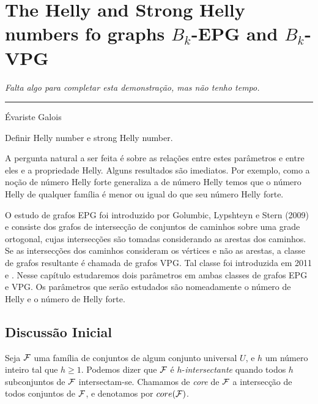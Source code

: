 \chapter{The Helly and Strong Helly numbers fo graphs $B_k$-EPG and $B_k$-VPG}
\label{cap:iv}

\begin{flushright}
\begin{minipage}[t][0cm][b]{0.47\textwidth}
\emph{
Falta algo para completar esta demonstração, mas não tenho tempo.}
\end{minipage}

\rule[0cm]{7cm}{0.03cm}%

Évariste Galois
\end{flushright}

Definir Helly number e strong Helly number.

A pergunta natural a ser feita é sobre as relações entre estes parâmetros e entre
eles e a propriedade Helly. Alguns resultados são imediatos. Por exemplo, como
a noção de número Helly forte generaliza a de número Helly temos que o número
Helly de qualquer família é menor ou igual do que seu número Helly forte.

O estudo de grafos EPG foi introduzido por  Golumbic, Lypshteyn e Stern (2009) e consiste dos grafos de intersecção de conjuntos de caminhos sobre uma grade ortogonal, cujas intersecções são tomadas considerando as arestas dos caminhos. Se as intersecções dos caminhos consideram os vértices e não as arestas, a classe de grafos resultante é chamada de grafos VPG. Tal classe foi introduzida em 2011 \cite{asinowski2011string} e \cite{asinowski2012}. Nesse capítulo estudaremos dois parâmetros em ambas classes de grafos EPG e VPG. Os parâmetros que serão estudados são nomeadamente o número de Helly e o número de Helly forte.

\section{Discussão Inicial}

Seja  $\cal {F}$ uma família de conjuntos de algum conjunto universal $U$, e $h$ um número inteiro tal que $h\geq 1$. Podemos dizer que $\cal{F}$ é $h$-{\it intersectante} quando todos  $h$ subconjuntos de $\cal {F}$ intersectam-se. Chamamos de {\it core} de $\cal {F}$ a intersecção de todos conjuntos de $\cal {F}$, e denotamos por $core(\cal F)$. 

